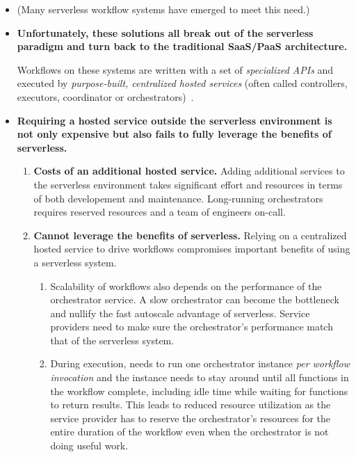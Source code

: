 \begin{itemize}
  \item (Many serverless workflow systems have emerged to meet this need.)

  \item \textbf{Unfortunately, these solutions all break out of the serverless
  paradigm and turn back to the traditional SaaS/PaaS architecture.}

  Workflows on these systems are written with a set of \emph{specialized APIs}
  and executed by \emph{purpose-built, centralized hosted services}
  (often called controllers, executors, coordinator or
  orchestrators)~\cite{gg-atc, excamera, kappa, triggerflow, pywren,
  durable-functions, aws-step-functions, google-cloud-composer,
  google-workflows}.

  \item \textbf{Requiring a hosted service outside the serverless environment
  is not only expensive but also fails to fully leverage the benefits of
  serverless.}

    \begin{enumerate}
      \item \textbf{Costs of an additional hosted service.} Adding additional
      services to the serverless environment takes significant effort and
      resources in terms of both developement and maintenance. Long-running
      orchestrators requires reserved resources and a team of engineers
      on-call.

      \item \textbf{Cannot leverage the benefits of serverless.} Relying on a
      centralized hosted service to drive workflows compromises important
      benefits of using a serverless system.

        \begin{enumerate}

          \item Scalability of workflows also depends on the performance of
          the orchestrator service. A slow orchestrator can become the
          bottleneck and nullify the fast autoscale advantage of serverless.
          Service providers need to make sure the orchestrator's performance
          match that of the serverless system.

          \item During execution, needs to run one orchestrator instance
          \emph{per workflow invocation} and the instance needs to stay around
          until all functions in the workflow complete, including idle time
          while waiting for functions to return results. This leads to reduced
          resource utilization as the service provider has to reserve the
          orchestrator's resources for the entire duration of the workflow
          even when the orchestrator is not doing useful work.


\end{enumerate}
\end{enumerate}
\end{itemize}
